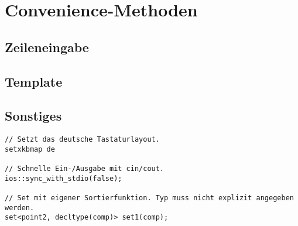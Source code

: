 \section{Convenience-Methoden}

\subsection{Zeileneingabe}


\subsection{Template}


\subsection{Sonstiges}
\begin{lstlisting}
// Setzt das deutsche Tastaturlayout.
setxkbmap de

// Schnelle Ein-/Ausgabe mit cin/cout.
ios::sync_with_stdio(false);

// Set mit eigener Sortierfunktion. Typ muss nicht explizit angegeben werden.
set<point2, decltype(comp)> set1(comp);
\end{lstlisting}
